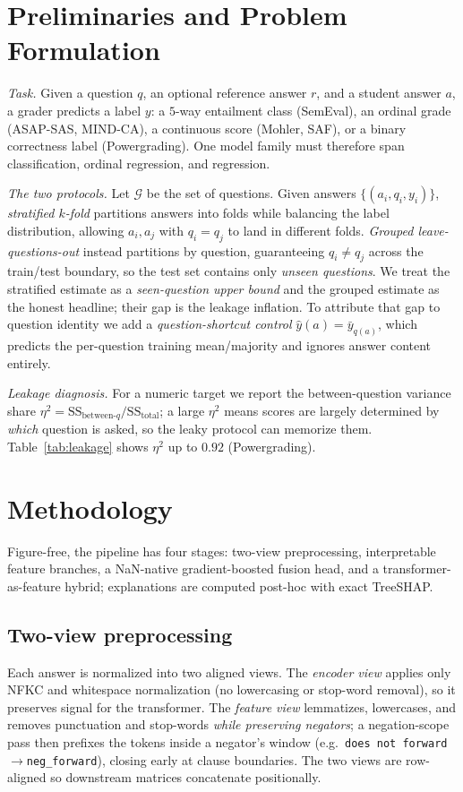 \documentclass[10pt,twocolumn]{article}
\begin{document}
\section{Preliminaries and Problem Formulation}
\label{sec:prelim}
\textit{Task.} Given a question $q$, an optional reference answer $r$, and a
student answer $a$, a grader predicts a label $y$: a $5$-way entailment class
(SemEval), an ordinal grade (ASAP-SAS, MIND-CA), a continuous score (Mohler,
SAF), or a binary correctness label (Powergrading). One model family must
therefore span classification, ordinal regression, and regression.

\textit{The two protocols.} Let $\mathcal{G}$ be the set of questions. Given
answers $\{(a_i,q_i,y_i)\}$, \emph{stratified $k$-fold} partitions answers into
folds while balancing the label distribution, allowing $a_i,a_j$ with $q_i=q_j$ to
land in different folds. \emph{Grouped leave-questions-out} instead partitions by
question, guaranteeing $q_i \neq q_j$ across the train/test boundary, so the test
set contains only \emph{unseen questions}. We treat the stratified estimate as a
\emph{seen-question upper bound} and the grouped estimate as the honest headline;
their gap is the leakage inflation. To attribute that gap to question identity we
add a \emph{question-shortcut control} $\hat{y}(a)=\bar{y}_{q(a)}$, which predicts
the per-question training mean/majority and ignores answer content entirely.

\textit{Leakage diagnosis.} For a numeric target we report the between-question
variance share $\eta^2 = \mathrm{SS}_{\text{between-}q}/\mathrm{SS}_{\text{total}}$;
a large $\eta^2$ means scores are largely determined by \emph{which} question is
asked, so the leaky protocol can memorize them. Table~\ref{tab:leakage} shows
$\eta^2$ up to $0.92$ (Powergrading).

\section{Methodology}
\label{sec:method}
Figure-free, the pipeline has four stages: two-view preprocessing, interpretable
feature branches, a NaN-native gradient-boosted fusion head, and a
transformer-as-feature hybrid; explanations are computed post-hoc with exact
TreeSHAP.

\subsection{Two-view preprocessing}
Each answer is normalized into two aligned views. The \emph{encoder view} applies
only NFKC and whitespace normalization (no lowercasing or stop-word removal), so
it preserves signal for the transformer. The \emph{feature view} lemmatizes,
lowercases, and removes punctuation and stop-words \emph{while preserving
negators}; a negation-scope pass then prefixes the tokens inside a negator's
window (e.g.\ \texttt{does not forward}$\rightarrow$\texttt{neg\_forward}), closing
early at clause boundaries. The two views are row-aligned so downstream matrices
concatenate positionally.
\end{document}
